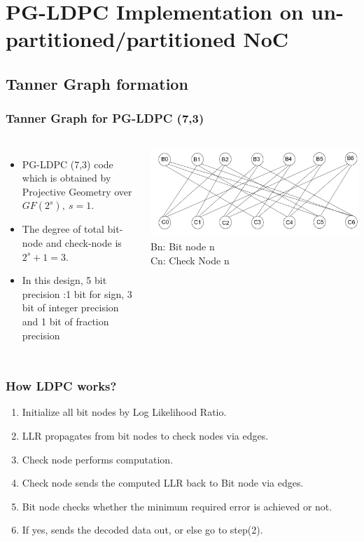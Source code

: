 
\section{PG-LDPC Implementation on un-partitioned/partitioned NoC}

\subsection{Tanner Graph formation}
\begin{frame}
\frametitle{Tanner Graph for PG-LDPC (7,3)}   %
\begin{columns}[c]
\column{2.5in}  %
\begin{itemize}
	\item PG-LDPC (7,3) code which is obtained by Projective Geometry over $GF(2^{s}),\ s=1$.
	\item The degree of total bit-node and check-node is $2^{s} +1 =3$.
	\item In this design, 5 bit precision :1 bit for sign, 3 bit of integer precision and 1 bit of fraction precision
\end{itemize} 

\column{2.5in}
\begin{center}
  \includegraphics[scale=0.2]{./diagram/tanner_graph}
  Bn: Bit node n\\
  Cn: Check Node n
  \end {center}
  \end{columns}
\end{frame}


\begin {frame}
    \frametitle{How LDPC works?}
	  \begin{enumerate}
	  \item Initialize all bit nodes by Log Likelihood Ratio.
	  \item LLR propagates from bit nodes to check nodes via edges.
	  \item Check node performs computation.
	  \item Check node sends the computed LLR back to Bit node via edges.
	  \item Bit node checks whether the minimum required error is achieved or not.
	  \item If yes, sends the decoded data out, or else go to step(2).
	  \end{enumerate} 
\end {frame}


